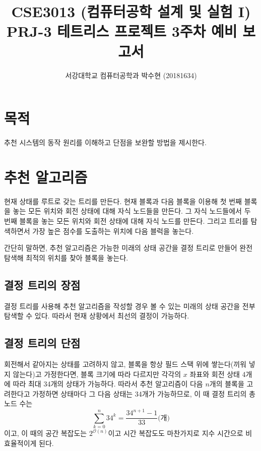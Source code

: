 
    
\usepackage{subfig}



\title{CSE3013 (컴퓨터공학 설계 및 실험 I) \space \newline PRJ-3 테트리스 프로젝트 3주차 예비 보고서}
\author{서강대학교 컴퓨터공학과 박수현 (20181634)}
\maketitle

\section{목적}
추천 시스템의 동작 원리를 이해하고 단점을 보완할 방법을 제시한다.

\section{추천 알고리즘}
현재 상태를 루트로 갖는 트리를 만든다. 현재 블록과 다음 블록을 이용해 첫 번째 블록을 놓는 모든 위치와 회전 상태에 대해 자식 노드들을 만든다.
그 자식 노드들에서 두 번째 블록을 놓는 모든 위치와 회전 상태에 대해 자식 노드를 만든다.
그리고 트리를 탐색하면서 가장 높은 점수를 도출하는 위치에 다음 블럭을 놓는다.

간단히 말하면, 추천 알고리즘은 가능한 미래의 상태 공간을 결정 트리로 만들어 완전 탐색해 최적의
위치를 찾아 블록을 놓는다.

\subsection{결정 트리의 장점}
결정 트리를 사용해 추천 알고리즘을 작성할 경우 볼 수 있는 미래의 상태 공간을 전부 탐색할 수 있다. 따라서 현재 상황에서 최선의 결정이 가능하다.

\subsection{결정 트리의 단점}
회전해서 같아지는 상태를 고려하지 않고, 블록을 항상 필드 스택 위에 쌓는다(끼워 넣지 않는다)고 가정한다면,
블록 크기에 따라 다르지만 각각의 $x$ 좌표와 회전 상태 4개에 따라 최대 34개의 상태가 가능하다. 따라서 추천 알고리즘이 다음 $n$개의 블록을 고려한다고 가정하면
상태마다 그 다음 상태는 34개가 가능하므로, 이 때 결정 트리의 총 노드 수는 \[\sum_{k=0}^{n} 34^k = \frac{34^{n+1} - 1}{33}\mbox{(개)}\]이고,
이 때의 공간 복잡도는 $2^{\mathcal{O}\left(n\right)}$이고 시간 복잡도도 마찬가지로 지수 시간으로 비효율적이게 된다.


